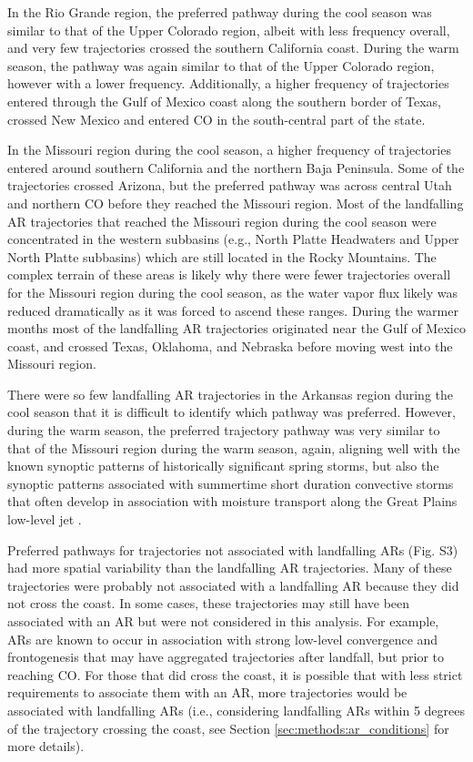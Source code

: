 \documentclass[draft]{agujournal2019}
\begin{document}
In the Rio Grande region, the preferred pathway during the cool season was similar to that of the Upper Colorado region, albeit with less frequency overall, and very few trajectories crossed the southern California coast. During the warm season, the pathway was again similar to that of the Upper Colorado region, however with a lower frequency. Additionally, a higher frequency of trajectories entered through the Gulf of Mexico coast along the southern border of Texas, crossed New Mexico and entered CO in the south-central part of the state. 

In the Missouri region during the cool season, a higher frequency of trajectories entered around southern California and the northern Baja Peninsula. Some of the trajectories crossed Arizona, but the preferred pathway was across central Utah and northern CO before they reached the Missouri region. Most of the landfalling AR trajectories that reached the Missouri region during the cool season were concentrated in the western subbasins (e.g., North Platte Headwaters and Upper North Platte subbasins) which are still located in the Rocky Mountains. The complex terrain of these areas is likely why there were fewer trajectories overall for the Missouri region during the cool season, as the water vapor flux likely was reduced dramatically as it was forced to ascend these ranges.  During the warmer months most of the landfalling AR trajectories originated near the Gulf of Mexico coast, and crossed Texas, Oklahoma, and Nebraska before moving west into the Missouri region. 

There were so few landfalling AR trajectories in the Arkansas region during the cool season that it is difficult to identify which pathway was preferred. However, during the warm season, the preferred trajectory pathway was very similar to that of the Missouri region during the warm season, again, aligning well with the known synoptic patterns of historically significant spring storms, but also the synoptic patterns associated with summertime short duration convective storms that often develop in association with moisture transport along the Great Plains low-level jet \cite{Helfand1995ClimatologyStates, Pu2016DynamicalPrecipitation,  Schubert1998SubseasonalStates, Weaver2008VariabilityImpacts}.

Preferred pathways for trajectories not associated with landfalling ARs (Fig. S3) had more spatial variability than the landfalling AR trajectories. Many of these trajectories were probably not associated with a landfalling AR because they did not cross the coast. In some cases, these trajectories may still have been associated with an AR but were not considered in this analysis. For example, ARs are known to occur in association with strong low-level convergence and frontogenesis \cite{Cordeira2013} that may have aggregated trajectories after landfall, but prior to reaching CO. For those that did cross the coast, it is possible that with less strict requirements to associate them with an AR, more trajectories would be associated with landfalling ARs (i.e., considering landfalling ARs within 5 degrees of the trajectory crossing the coast, see Section \ref{sec:methods:ar_conditions} for more details).
\end{document}
